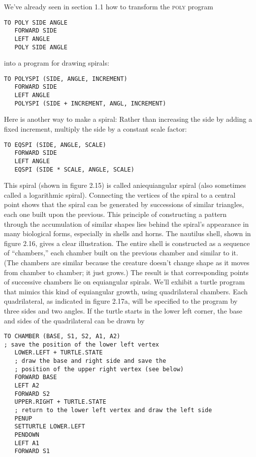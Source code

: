 \documentclass{book}
\begin{document}
We've already seen in section 1.1 how to transform the \textsc{poly} program

\begin{verbatim}
TO POLY SIDE ANGLE
   FORWARD SIDE
   LEFT ANGLE
   POLY SIDE ANGLE
\end{verbatim}
\noindent into a program for drawing spirals:

\begin{verbatim}
TO POLYSPI (SIDE, ANGLE, INCREMENT)
   FORWARD SIDE
   LEFT ANGLE
   POLYSPI (SIDE + INCREMENT, ANGL, INCREMENT)
\end{verbatim}
Here is another way to make a spiral: Rather than increasing the side by
adding a fixed increment, multiply the side by a constant scale factor:

\begin{verbatim}
TO EQSPI (SIDE, ANGLE, SCALE)
   FORWARD SIDE
   LEFT ANGLE
   EQSPI (SIDE * SCALE, ANGLE, SCALE)
\end{verbatim}
This spiral (shown in figure 2.15) is called aniequiangular spiral (also
sometimes called a logarithmic spiral). Connecting the vertices of the
spiral to a central point shows that the spiral can be generated by 
successions of similar triangles, each one built upon the previous. This
principle of constructing a pattern through the accumulation of similar
shapes lies behind the spiral's appearance in many biological forms,
especially in shells and horns. The nautilus shell, shown in figure 2.16,
gives a clear illustration. The entire shell is constructed as a sequence of
``chambers,'' each chamber built on the previous chamber and similar to
it. (The chambers are similar because the creature doesn't change shape
as it moves from chamber to chamber; it just grows.) The result is that
corresponding points of successive chambers lie on equiangular spirals.
We'll exhibit a turtle program that mimics this kind of equiangular
growth, using quadrilateral chambers. Each quadrilateral, as indicated
in figure 2.17a, will be specified to the program by three sides and two
angles. If the turtle starts in the lower left corner, the base and sides of
the quadrilateral can be drawn by

\begin{verbatim}
TO CHAMBER (BASE, S1, S2, A1, A2)
; save the position of the lower left vertex
   LOWER.LEFT + TURTLE.STATE
   ; draw the base and right side and save the
   ; position of the upper right vertex (see below)
   FORWARD BASE
   LEFT A2
   FORWARD S2
   UPPER.RIGHT + TURTLE.STATE
   ; return to the lower left vertex and draw the left side
   PENUP
   SETTURTLE LOWER.LEFT
   PENDOWN
   LEFT A1
   FORWARD S1
\end{verbatim}
\end{document}
